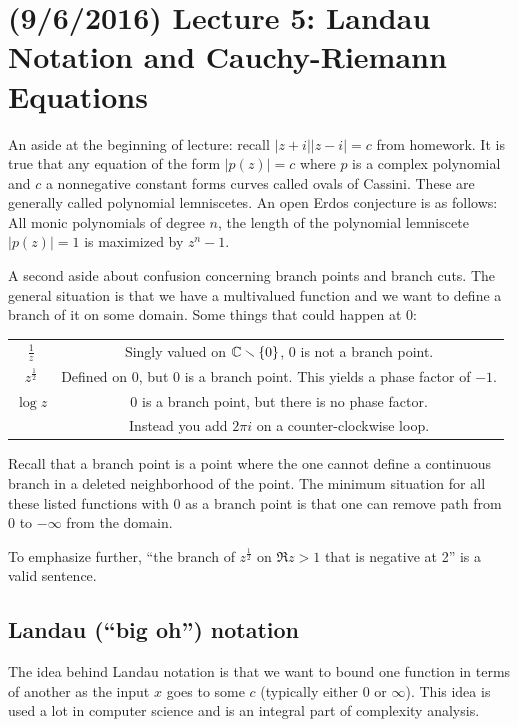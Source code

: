 \documentclass[11pt,leqno,oneside]{amsart}
\begin{document}
\section{(9/6/2016) Lecture 5: Landau Notation and Cauchy-Riemann Equations}
\begin{rmk*}
    An aside at the beginning of lecture: recall $|z+i||z-i|=c$ from homework.
    It is true that any equation of the form $|p(z)| = c$ where $p$ is a
    complex polynomial and $c$ a nonnegative constant forms curves called ovals
    of Cassini. These are generally called polynomial lemniscetes. An open
    Erdos conjecture is as follows: \\

    All monic polynomials of degree $n$, the length of the polynomial
    lemniscete $|p(z)|=1$ is maximized by $z^n-1$.
\end{rmk*}

    A second aside about confusion concerning branch points and branch cuts.
    The general situation is that we have a multivalued function and we want to
    define a branch of it on some domain. Some things that could happen at 0:
    \\
    \begin{tabular}{|c|c|}
        \hline
        $\frac{1}{z}$ & Singly valued on ${\mathbb C} \smallsetminus \{0\}$, 0 is not a
        branch point. \\
        $z^{\frac{1}{2}}$ & Defined on 0, but 0 is a branch point. This yields
        a phase factor of $-1$. \\
        $\log z$ & 0 is a branch point, but there is no phase factor. \\ \ & Instead
        you add $2\pi i$ on a counter-clockwise loop. \\
        \hline
    \end{tabular}
    Recall that a branch point is a point where the one cannot define a
    continuous branch in a deleted neighborhood of the point. The minimum
    situation for all these listed functions with 0 as a branch point is that
    one can remove path from 0 to $-\infty$ from the domain.

    To emphasize further, ``the branch of $z^\frac{1}{2}$ on $\Re z > 1$ that
    is negative at 2'' is a valid sentence.

    \subsection*{Landau (``big oh'') notation}
    The idea behind Landau notation is that we want to bound one function in
    terms of another as the input $x$ goes to some $c$ (typically either 0 or
    $\infty$). This idea is used a lot in computer science and is an integral
    part of complexity analysis.
\end{document}
